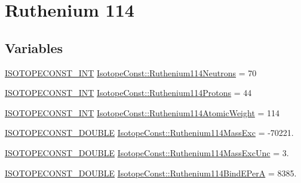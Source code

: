 \hypertarget{group___isotope_const-_ruthenium-_ru114}{}\section{Ruthenium 114}
\label{group___isotope_const-_ruthenium-_ru114}
\subsection*{Variables}
\begin{DoxyCompactItemize}
\item 
\mbox{\hyperlink{group___isotope_const-_macros_ga5f18360b3e99483a35c32d789e62621c}{I\+S\+O\+T\+O\+P\+E\+C\+O\+N\+S\+T\+\_\+\+I\+NT}} \mbox{\hyperlink{group___isotope_const-_ruthenium-_ru114_ga52c6a1501dd0279f0837848b4f6d5900}{Isotope\+Const\+::\+Ruthenium114\+Neutrons}} = 70
\item 
\mbox{\hyperlink{group___isotope_const-_macros_ga5f18360b3e99483a35c32d789e62621c}{I\+S\+O\+T\+O\+P\+E\+C\+O\+N\+S\+T\+\_\+\+I\+NT}} \mbox{\hyperlink{group___isotope_const-_ruthenium-_ru114_ga63284d914c1c7cfc9794f7a429f7e0f5}{Isotope\+Const\+::\+Ruthenium114\+Protons}} = 44
\item 
\mbox{\hyperlink{group___isotope_const-_macros_ga5f18360b3e99483a35c32d789e62621c}{I\+S\+O\+T\+O\+P\+E\+C\+O\+N\+S\+T\+\_\+\+I\+NT}} \mbox{\hyperlink{group___isotope_const-_ruthenium-_ru114_ga2530f96280835bb7789a3cd556bbc24e}{Isotope\+Const\+::\+Ruthenium114\+Atomic\+Weight}} = 114
\item 
\mbox{\hyperlink{group___isotope_const-_macros_ga8f45a7272ce02c0b4c65c44636ed719a}{I\+S\+O\+T\+O\+P\+E\+C\+O\+N\+S\+T\+\_\+\+D\+O\+U\+B\+LE}} \mbox{\hyperlink{group___isotope_const-_ruthenium-_ru114_gaa38600898001f617ef202d48c54925d4}{Isotope\+Const\+::\+Ruthenium114\+Mass\+Exc}} = -\/70221.
\item 
\mbox{\hyperlink{group___isotope_const-_macros_ga8f45a7272ce02c0b4c65c44636ed719a}{I\+S\+O\+T\+O\+P\+E\+C\+O\+N\+S\+T\+\_\+\+D\+O\+U\+B\+LE}} \mbox{\hyperlink{group___isotope_const-_ruthenium-_ru114_ga8bcc688f6a628c9286325b61d81868b4}{Isotope\+Const\+::\+Ruthenium114\+Mass\+Exc\+Unc}} = 3.
\item 
\mbox{\hyperlink{group___isotope_const-_macros_ga8f45a7272ce02c0b4c65c44636ed719a}{I\+S\+O\+T\+O\+P\+E\+C\+O\+N\+S\+T\+\_\+\+D\+O\+U\+B\+LE}} \mbox{\hyperlink{group___isotope_const-_ruthenium-_ru114_ga21e5e64cff26e8157c4cbd62cc8d7f2a}{Isotope\+Const\+::\+Ruthenium114\+Bind\+E\+PerA}} = 8385.
\item 

\end{DoxyCompactItemize}
